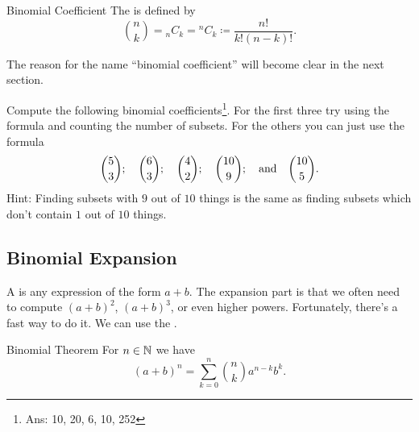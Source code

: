 \documentclass[fleqn]{LectureClass/LectureClass}
\begin{document}
    \begin{dfn}{Binomial Coefficient}{}
        The  is defined by
        \begin{equation}
            \binom{n}{k} = {}_nC_k = {}^nC_k \coloneq \frac{n!}{k!(n - k)!}.
        \end{equation}
    \end{dfn}
     
    The reason for the name \enquote{binomial coefficient} will become clear in the next section.
     
    \begin{problem}{}{}
        Compute the following binomial coefficients\footnote{Ans: 10, 20, 6, 10, 252}.
        For the first three try using the formula and counting the number of subsets.
        For the others you can just use the formula
        \begin{equation}
            \binom{5}{3}; \quad \binom{6}{3}; \quad \binom{4}{2}; \quad \binom{10}{9}; \quad\text{and}\quad \binom{10}{5}.
        \end{equation}
        Hint: Finding subsets with \(9\) out of \(10\) things is the same as finding subsets which don't contain \(1\) out of \(10\) things.
    \end{problem}
     
    \subsection{Binomial Expansion}
    A  is any expression of the form \(a + b\).
    The expansion part is that we often need to compute \((a + b)^2\), \((a + b)^3\), or even higher powers.
    Fortunately, there's a fast way to do it.
    We can use the .
     
    \begin{thm}{Binomial Theorem}{}
        For \(n \in \mathbb{N}\) we have
        \begin{equation}
            (a + b)^n = \sum_{k=0}^n \binom{n}{k} a^{n-k}b^k.
        \end{equation}
    \end{thm}
     
\end{document}
